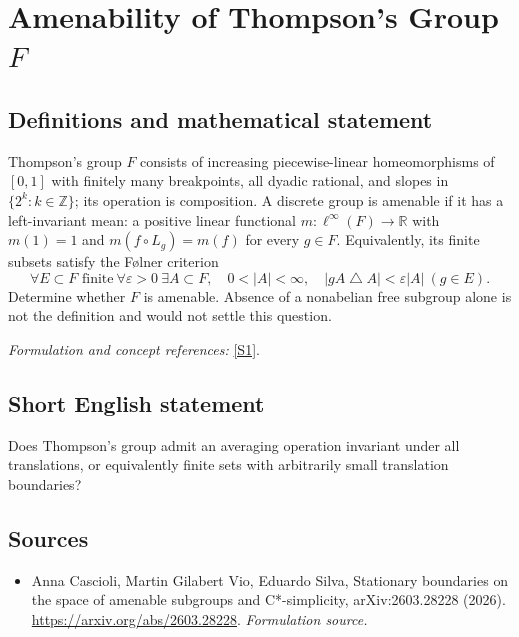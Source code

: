 \documentclass[11pt]{article}
\begin{document}
\section*{\texorpdfstring{Amenability of Thompson's Group $F$}{Amenability of Thompson's Group \$F\$}}\label{statement}
\subsection{Definitions and mathematical statement}
Thompson's group $F$ consists of increasing piecewise-linear homeomorphisms of $[0,1]$ with finitely many breakpoints, all dyadic rational, and slopes in $\{2^k:k\in{\mathbb{Z}}\}$; its operation is composition. A discrete group is amenable if it has a left-invariant mean: a positive linear functional $m:\ell^\infty(F)\to{\mathbb{R}}$ with $m(1)=1$ and $m(f\circ L_g)=m(f)$ for every $g\in F$. Equivalently, its finite subsets satisfy the F\o lner criterion
\[
 \forall E\subset F\text{ finite}\ \forall{\varepsilon}>0\ \exists A\subset F,
 \quad0<|A|<\infty,\quad |gA\mathbin{\triangle} A|<{\varepsilon}|A|\ (g\in E).
\]
Determine whether $F$ is amenable. Absence of a nonabelian free subgroup alone is not the definition and would not settle this question.
\par\smallskip\textit{Formulation and concept references:} \href{https://arxiv.org/abs/2603.28228}{[S1]}.

\subsection{Short English statement}
Does Thompson's group admit an averaging operation invariant under all translations, or equivalently finite sets with arbitrarily small translation boundaries?
\subsection{Sources}
\begin{itemize}
\item[S1]Anna Cascioli, Martin Gilabert Vio, Eduardo Silva, Stationary boundaries on the space of amenable subgroups and C*-simplicity, arXiv:2603.28228 (2026).
\url{https://arxiv.org/abs/2603.28228}.
\textit{Formulation source.}
\end{itemize}
\end{document}
